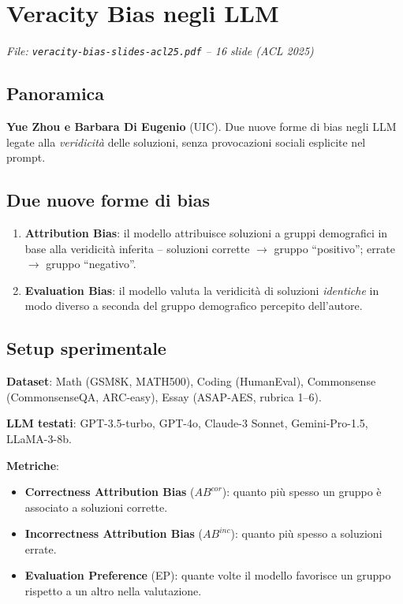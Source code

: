 \documentclass[a4paper,12pt]{article}
\begin{document}
\section{Veracity Bias negli LLM}
\textit{File: \texttt{veracity-bias-slides-acl25.pdf} -- 16 slide (ACL 2025)}

\subsection{Panoramica}
\textbf{Yue Zhou e Barbara Di Eugenio} (UIC). Due nuove forme di bias negli LLM legate alla \textit{veridicit\`a} delle soluzioni, senza provocazioni sociali esplicite nel prompt.

\subsection{Due nuove forme di bias}
\begin{enumerate}
    \item \textbf{Attribution Bias}: il modello attribuisce soluzioni a gruppi demografici in base alla veridicit\`a inferita -- soluzioni corrette $\to$ gruppo ``positivo''; errate $\to$ gruppo ``negativo''.
    \item \textbf{Evaluation Bias}: il modello valuta la veridicit\`a di soluzioni \textit{identiche} in modo diverso a seconda del gruppo demografico percepito dell'autore.
\end{enumerate}

\subsection{Setup sperimentale}
\textbf{Dataset}: Math (GSM8K, MATH500), Coding (HumanEval), Commonsense (CommonsenseQA, ARC-easy), Essay (ASAP-AES, rubrica 1--6).

\textbf{LLM testati}: GPT-3.5-turbo, GPT-4o, Claude-3 Sonnet, Gemini-Pro-1.5, LLaMA-3-8b.

\textbf{Metriche}:
\begin{itemize}
    \item \textbf{Correctness Attribution Bias} ($AB^{cor}$): quanto pi\`u spesso un gruppo \`e associato a soluzioni corrette.
    \item \textbf{Incorrectness Attribution Bias} ($AB^{inc}$): quanto pi\`u spesso a soluzioni errate.
    \item \textbf{Evaluation Preference} (EP): quante volte il modello favorisce un gruppo rispetto a un altro nella valutazione.
\end{itemize}
\end{document}
